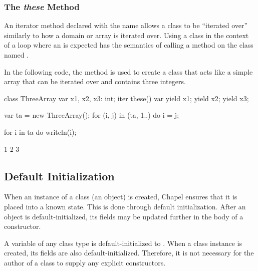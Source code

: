 \subsubsection{The {\em these} Method}
\label{The_these_Method}

An iterator method declared with the name  allows a class to be
``iterated over'' similarly to how a domain or array is iterated over.
Using a class in the context of a loop where
an  is expected has the semantics of calling
a method on the class named .

\begin{example}
In the following code, the  method is used to create a
class that acts like a simple array that can be iterated over and
contains three integers.
\begin{chapelpre}
\end{chapelpre}
\begin{chapel}
class ThreeArray {
  var x1, x2, x3: int;
  iter these() var {
    yield x1;
    yield x2;
    yield x3;
  }
}
\end{chapel}
\begin{chapelpost}
var ta = new ThreeArray();
for (i, j) in (ta, 1..) do
  i = j;

for i in ta do
  writeln(i);
\end{chapelpost}
\begin{chapeloutput}
1
2
3
\end{chapeloutput}

\end{example}

\subsection{Default Initialization}
\label{Default_Initialization}

When an instance of a class (an object) is created, Chapel ensures that it is
placed into a known state.  This is done through default initialization.
After an object is default-initialized, its fields may be updated further
in the body of a constructor.

A variable of any class type is default-initialized to .  
When a class instance is created, its fields are also default-initialized.
Therefore, it is not necessary for the author of a class to supply any explicit
constructors.

